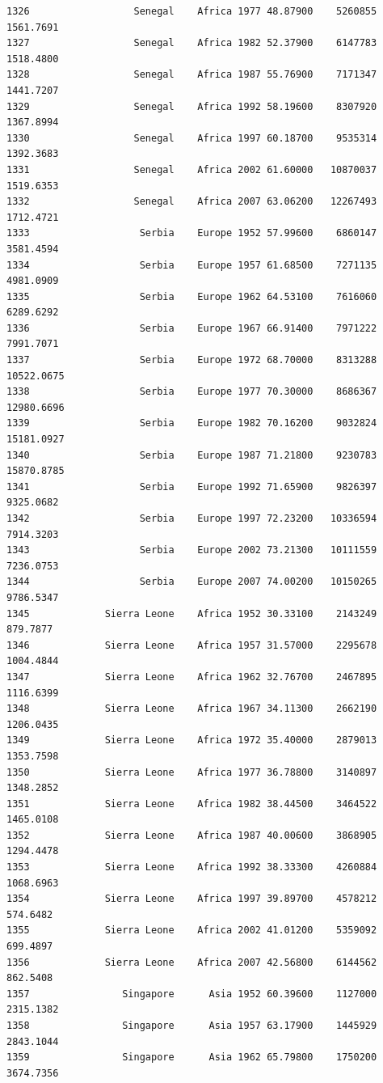\documentclass[
  letterpaper,
  DIV=11,
  numbers=noendperiod]{scrreprt}
\begin{document}
\begin{verbatim}
1326                  Senegal    Africa 1977 48.87900    5260855   1561.7691
1327                  Senegal    Africa 1982 52.37900    6147783   1518.4800
1328                  Senegal    Africa 1987 55.76900    7171347   1441.7207
1329                  Senegal    Africa 1992 58.19600    8307920   1367.8994
1330                  Senegal    Africa 1997 60.18700    9535314   1392.3683
1331                  Senegal    Africa 2002 61.60000   10870037   1519.6353
1332                  Senegal    Africa 2007 63.06200   12267493   1712.4721
1333                   Serbia    Europe 1952 57.99600    6860147   3581.4594
1334                   Serbia    Europe 1957 61.68500    7271135   4981.0909
1335                   Serbia    Europe 1962 64.53100    7616060   6289.6292
1336                   Serbia    Europe 1967 66.91400    7971222   7991.7071
1337                   Serbia    Europe 1972 68.70000    8313288  10522.0675
1338                   Serbia    Europe 1977 70.30000    8686367  12980.6696
1339                   Serbia    Europe 1982 70.16200    9032824  15181.0927
1340                   Serbia    Europe 1987 71.21800    9230783  15870.8785
1341                   Serbia    Europe 1992 71.65900    9826397   9325.0682
1342                   Serbia    Europe 1997 72.23200   10336594   7914.3203
1343                   Serbia    Europe 2002 73.21300   10111559   7236.0753
1344                   Serbia    Europe 2007 74.00200   10150265   9786.5347
1345             Sierra Leone    Africa 1952 30.33100    2143249    879.7877
1346             Sierra Leone    Africa 1957 31.57000    2295678   1004.4844
1347             Sierra Leone    Africa 1962 32.76700    2467895   1116.6399
1348             Sierra Leone    Africa 1967 34.11300    2662190   1206.0435
1349             Sierra Leone    Africa 1972 35.40000    2879013   1353.7598
1350             Sierra Leone    Africa 1977 36.78800    3140897   1348.2852
1351             Sierra Leone    Africa 1982 38.44500    3464522   1465.0108
1352             Sierra Leone    Africa 1987 40.00600    3868905   1294.4478
1353             Sierra Leone    Africa 1992 38.33300    4260884   1068.6963
1354             Sierra Leone    Africa 1997 39.89700    4578212    574.6482
1355             Sierra Leone    Africa 2002 41.01200    5359092    699.4897
1356             Sierra Leone    Africa 2007 42.56800    6144562    862.5408
1357                Singapore      Asia 1952 60.39600    1127000   2315.1382
1358                Singapore      Asia 1957 63.17900    1445929   2843.1044
1359                Singapore      Asia 1962 65.79800    1750200   3674.7356

\end{verbatim}
\end{document}
